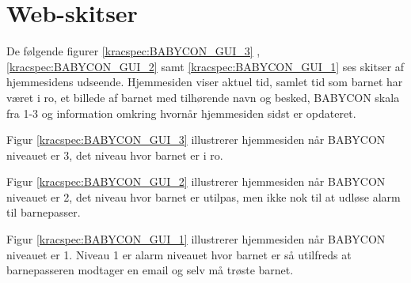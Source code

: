 \section{Web-skitser}


De følgende figurer \ref{kracspec:BABYCON_GUI_3} , \ref{kracspec:BABYCON_GUI_2} samt \ref{kracspec:BABYCON_GUI_1} ses skitser af hjemmesidens udseende. Hjemmesiden viser aktuel tid, samlet tid som barnet har været i ro, et billede af barnet med tilhørende navn og besked, BABYCON skala fra 1-3 og information omkring hvornår hjemmesiden sidst er opdateret.


Figur \ref{kracspec:BABYCON_GUI_3} illustrerer hjemmesiden når BABYCON niveauet er 3, det niveau hvor barnet er i ro.


Figur \ref{kracspec:BABYCON_GUI_2} illustrerer hjemmesiden når BABYCON niveauet er 2, det niveau hvor barnet er utilpas, men ikke nok til at udløse alarm til barnepasser.


Figur \ref{kracspec:BABYCON_GUI_1} illustrerer hjemmesiden når BABYCON niveauet er 1. Niveau 1 er alarm niveauet hvor barnet er så utilfreds at barnepasseren modtager en email og selv må trøste barnet.